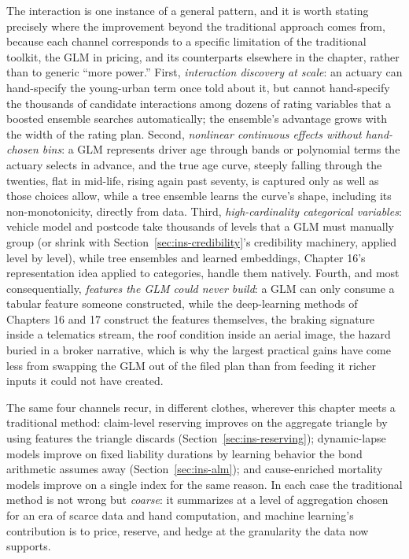\documentclass[../ai_in_finance]{subfiles}
\begin{document}
The interaction is one instance of a general pattern, and it is worth stating precisely where the improvement beyond the traditional approach comes from, because each channel corresponds to a specific limitation of the traditional toolkit, the GLM in pricing, and its counterparts elsewhere in the chapter, rather than to generic ``more power.'' First, \emph{interaction discovery at scale}: an actuary can hand-specify the young-urban term once told about it, but cannot hand-specify the thousands of candidate interactions among dozens of rating variables that a boosted ensemble searches automatically; the ensemble's advantage grows with the width of the rating plan. Second, \emph{nonlinear continuous effects without hand-chosen bins}: a GLM represents driver age through bands or polynomial terms the actuary selects in advance, and the true age curve, steeply falling through the twenties, flat in mid-life, rising again past seventy, is captured only as well as those choices allow, while a tree ensemble learns the curve's shape, including its non-monotonicity, directly from data. Third, \emph{high-cardinality categorical variables}: vehicle model and postcode take thousands of levels that a GLM must manually group (or shrink with Section~\ref{sec:ins-credibility}'s credibility machinery, applied level by level), while tree ensembles and learned embeddings, Chapter 16's representation idea applied to categories, handle them natively. Fourth, and most consequentially, \emph{features the GLM could never build}: a GLM can only consume a tabular feature someone constructed, while the deep-learning methods of Chapters 16 and 17 construct the features themselves, the braking signature inside a telematics stream, the roof condition inside an aerial image, the hazard buried in a broker narrative, which is why the largest practical gains have come less from swapping the GLM out of the filed plan than from feeding it richer inputs it could not have created.

The same four channels recur, in different clothes, wherever this chapter meets a traditional method: claim-level reserving improves on the aggregate triangle by using features the triangle discards (Section~\ref{sec:ins-reserving}); dynamic-lapse models improve on fixed liability durations by learning behavior the bond arithmetic assumes away (Section~\ref{sec:ins-alm}); and cause-enriched mortality models improve on a single index for the same reason. In each case the traditional method is not wrong but \emph{coarse}: it summarizes at a level of aggregation chosen for an era of scarce data and hand computation, and machine learning's contribution is to price, reserve, and hedge at the granularity the data now supports.
\end{document}
